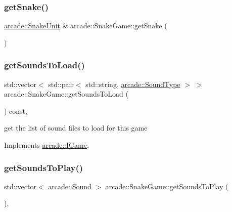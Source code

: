 \subsubsection{\texorpdfstring{get\+Snake()}{getSnake()}}
{\footnotesize\ttfamily \hyperlink{classarcade_1_1_snake_unit}{arcade\+::\+Snake\+Unit} \& arcade\+::\+Snake\+Game\+::get\+Snake (\begin{DoxyParamCaption}{ }\end{DoxyParamCaption})}

\mbox{\label{classarcade_1_1_snake_game_a2d8ca7114ab012187da99658a221fab9}} 
\subsubsection{\texorpdfstring{get\+Sounds\+To\+Load()}{getSoundsToLoad()}}
{\footnotesize\ttfamily std\+::vector$<$ std\+::pair$<$ std\+::string, \hyperlink{namespacearcade_a3bb4743a2eea59f3927e404e6549cae5}{arcade\+::\+Sound\+Type} $>$ $>$ arcade\+::\+Snake\+Game\+::get\+Sounds\+To\+Load (\begin{DoxyParamCaption}{ }\end{DoxyParamCaption}) const\hspace{0.3cm}{\ttfamily [override]}, {\ttfamily [virtual]}}



get the list of sound files to load for this game 



Implements \hyperlink{classarcade_1_1_i_game_a0b66cd9ef3b5cd0dff95debb7e4f594e}{arcade\+::\+I\+Game}.

\mbox{\label{classarcade_1_1_snake_game_aab993e72ca1b68914c37209781a68835}} 
\subsubsection{\texorpdfstring{get\+Sounds\+To\+Play()}{getSoundsToPlay()}}
{\footnotesize\ttfamily std\+::vector$<$ \hyperlink{structarcade_1_1_sound}{arcade\+::\+Sound} $>$ arcade\+::\+Snake\+Game\+::get\+Sounds\+To\+Play (\begin{DoxyParamCaption}{ }\end{DoxyParamCaption})\hspace{0.3cm}{\ttfamily [override]}, {\ttfamily [virtual]}}




